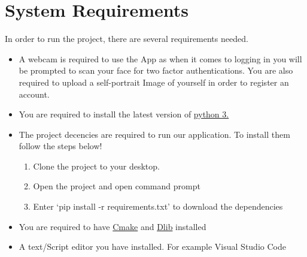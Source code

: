 \documentclass{article}
\begin{document}
\section{System Requirements}
In order to run the project, there are several requirements needed.
\begin{itemize}
  \item A webcam is required to use the App as when it comes to logging in you will be prompted to scan your face for two factor authentications.  You are also required to upload a self-portrait Image of yourself in order to register an account.
  \item You are required to install the latest version of \href{https://www.python.org/downloads/}{python 3.}
  \item The project decencies are required to run our application. To install them follow the steps below! 
    \begin{enumerate}
    \item Clone the project to your desktop.
    \item Open the project and open command prompt
    \item Enter ‘pip install -r requirements.txt’ to download the dependencies
    \end{enumerate}
  \item You are required to have \href{https://cmake.org/}{Cmake} and \href{http://dlib.net/}{Dlib} installed
  \item A text/Script editor you have installed. For example Visual Studio Code
\end{itemize}
\end{document}
